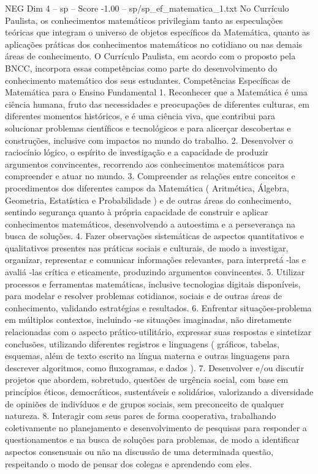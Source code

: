 \begin{textsample}{NEG Dim 4 – sp – Score -1.00 – sp/sp\_ef\_matematica\_1.txt}
No Currículo Paulista, os conhecimentos matemáticos privilegiam tanto as especulações teóricas que integram o universo de objetos específicos da Matemática, quanto as aplicações práticas dos conhecimentos matemáticos no cotidiano ou nas demais áreas de conhecimento.
O Currículo Paulista, em acordo com o proposto pela BNCC, incorpora essas competências como parte do desenvolvimento do conhecimento matemático dos seus estudantes.
Competências Específicas de Matemática para o Ensino Fundamental 1.
Reconhecer que a Matemática é uma ciência humana, fruto das necessidades e preocupações de diferentes culturas, em diferentes momentos históricos, e é uma ciência viva, que contribui para solucionar problemas científicos e tecnológicos e para alicerçar descobertas e construções, inclusive com impactos no mundo do trabalho. 2.
Desenvolver o raciocínio lógico, o espírito de investigação e a capacidade de produzir argumentos convincentes, recorrendo aos conhecimentos matemáticos para compreender e atuar no mundo. 3.
Compreender as relações entre conceitos e procedimentos dos diferentes campos da Matemática ( Aritmética, Álgebra, Geometria, Estatística e Probabilidade ) e de outras áreas do conhecimento, sentindo segurança quanto à própria capacidade de construir e aplicar conhecimentos matemáticos, desenvolvendo a autoestima e a perseverança na busca de soluções. 4.
Fazer observações sistemáticas de aspectos quantitativos e qualitativos presentes nas práticas sociais e culturais, de modo a investigar, organizar, representar e comunicar informações relevantes, para interpretá -las e avaliá -las crítica e eticamente, produzindo argumentos convincentes. 5.
Utilizar processos e ferramentas matemáticas, inclusive tecnologias digitais disponíveis, para modelar e resolver problemas cotidianos, sociais e de outras áreas de conhecimento, validando estratégias e resultados. 6.
Enfrentar situações-problema em múltiplos contextos, incluindo -se situações imaginadas, não diretamente relacionadas com o aspecto prático-utilitário, expressar suas respostas e sintetizar conclusões, utilizando diferentes registros e linguagens ( gráficos, tabelas, esquemas, além de texto escrito na língua materna e outras linguagens para descrever algoritmos, como fluxogramas, e dados ). 7.
Desenvolver e/ou discutir projetos que abordem, sobretudo, questões de urgência social, com base em princípios éticos, democráticos, sustentáveis e solidários, valorizando a diversidade de opiniões de indivíduos e de grupos sociais, sem preconceito de qualquer natureza. 8.
Interagir com seus pares de forma cooperativa, trabalhando coletivamente no planejamento e desenvolvimento de pesquisas para responder a questionamentos e na busca de soluções para problemas, de modo a identificar aspectos consensuais ou não na discussão de uma determinada questão, respeitando o modo de pensar dos colegas e aprendendo com eles.

\end{textsample}
